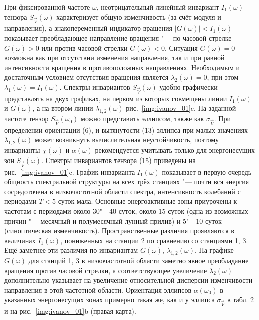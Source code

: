 {{При фиксированной частоте $\omega$, неотрицательный линейный инвариант ${I_1}(\omega)$ тензора $S_{\vec{V}}(\omega)$ характеризует общую изменчивость (за счёт модуля и направления), а знакопеременный индикатор вращения $|G(\omega)|<{I_1}(\omega)$ показывает преобладающее направление вращения "--- по часовой стрелке $G(\omega)>0$ или против часовой стрелки $G(\omega)<0$. Ситуация $G(\omega)=0$ возможна как при отсутствии изменения направления, так и при равной интенсивности вращения в противоположных направлениях. Необходимым и достаточным условием отсутствия вращения является ${\lambda_{2}}(\omega)=0$, при этом ${\lambda_{1}}(\omega)={I_1}(\omega)$. Спектры инвариантов $S_{\vec{V}}(\omega)$ удобно графически представлять на двух графиках, на первом из которых совмещены линии  ${I_1}(\omega)$ и $G(\omega)$, а на втором линии ${\lambda_{1,2}}(\omega)$ рис.~\ref{img:ivanov_01}c. На заданной частоте тензор $S_{\vec{V}}(\omega_0)$ можно представить эллипсом, также как $\sigma_{\vec{V}}$. При определении ориентации (6), и вытянутости (13) эллипса при малых значениях ${\lambda_{1,2}}(\omega)$ может возникнуть вычислительная неустойчивость, поэтому инварианты $\chi(\omega)$ и $\alpha(\omega)$ рекомендуется учитывать только для энергонесущих зон $S_{\vec{V}}(\omega)$.
Спектры инвариантов тензора (15) приведены на рис.~\ref{img:ivanov_01}c. График инварианта ${I_1}(\omega)$ показывает в первую очередь общность спектральной структуры на всех трёх станциях "--- почти вся энергия сосредоточена в низкочастотной области спектра, интенсивность колебаний с периодами $T<5$ суток мала. Основные энергоактивные зоны приурочены к частотам с периодами около 30"--~40 суток, около 15 суток (одна из возможных причин "--- месячный и полумесячный лунный прилив) и 5"--~10 суток (синоптическая изменчивость). Пространственные различия проявляются в величинах ${I_1}(\omega)$, пониженных на станции 2 по сравнению со станциями 1, 3. Ещё заметнее эти различия по инвариантам $G(\omega)$, ${\lambda_{1,2}}(\omega)$. На графике $G(\omega)$ для станций 1, 3 в низкочастотной области заметно явное преобладание вращения против часовой стрелки, а соответствующее увеличение ${\lambda_{2}}(\omega)$ дополнительно указывает на увеличение относительной дисперсии изменчивости направления в этой частотной области. Ориентация эллипсов $\alpha(\omega_0)$ в указанных энергонесущих зонах примерно такая же, как и у эллипса $\sigma_{\vec{V}}$ в табл. 2 и на рис.~\ref{img:ivanov_01}b (правая карта).  

}}
